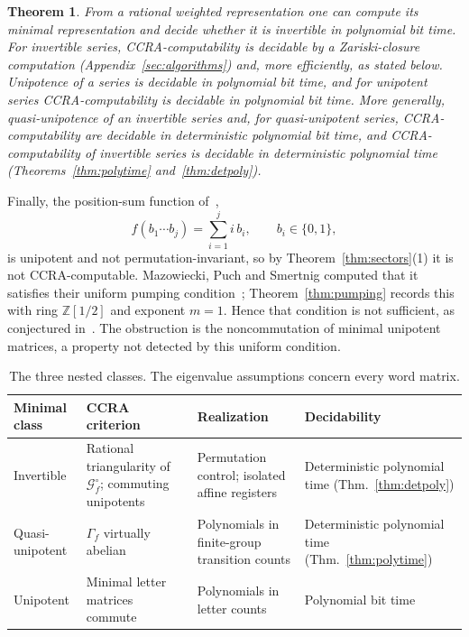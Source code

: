 \documentclass[11pt,letterpaper]{article}
\newcommand{\Z}{\mathbb{Z}}
\newcommand{\cG}{\mathcal{G}}
\newtheorem{theorem}{Theorem}
\theoremstyle{definition}
\begin{document}
\begin{theorem}\label{thm:decision}
From a rational weighted representation one can compute its minimal representation and decide whether it is invertible in polynomial bit time. For invertible series, CCRA-computability is decidable by a Zariski-closure computation (Appendix~\ref{sec:algorithms}) and, more efficiently, as stated below. Unipotence of a series is decidable in polynomial bit time, and for unipotent series CCRA-computability is decidable in polynomial bit time. More generally, quasi-unipotence of an invertible series and, for quasi-unipotent series, CCRA-computability are decidable in deterministic polynomial bit time, and CCRA-computability of invertible series is decidable in deterministic polynomial time (Theorems~\ref{thm:polytime} and~\ref{thm:detpoly}).
\end{theorem}

Finally, the position-sum function of~\cite[Example~26]{MPS26},
\begin{equation}\label{eq:witness}
 f(b_1\cdots b_j)=\sum_{i=1}^j i\,b_i,\qquad b_i\in\{0,1\},
\end{equation}
is unipotent and not permutation-invariant, so by Theorem~\ref{thm:sectors}(1) it is not CCRA-computable. Mazowiecki, Puch and Smertnig computed that it satisfies their uniform pumping condition~\cite[Example~26]{MPS26}; Theorem~\ref{thm:pumping} records this with ring $\Z[1/2]$ and exponent $m=1$. Hence that condition is not sufficient, as conjectured in~\cite[Section~3.2]{MPS26}. The obstruction is the noncommutation of minimal unipotent matrices, a property not detected by this uniform condition.

\begin{table}[t]
\centering
\begin{tabular}{@{}>{\raggedright\arraybackslash}p{.19\linewidth}>{\raggedright\arraybackslash}p{.29\linewidth}>{\raggedright\arraybackslash}p{.27\linewidth}>{\raggedright\arraybackslash}p{.15\linewidth}@{}}
\toprule
Minimal class & CCRA criterion & Realization & Decidability\\
\midrule
Invertible & Rational triangularity of $\cG_f^\circ$; commuting unipotents & Permutation control; isolated affine registers & Deterministic polynomial time (Thm.~\ref{thm:detpoly})\\
Quasi-unipotent & $\Gamma_f$ virtually abelian & Polynomials in finite-group transition counts & Deterministic polynomial time (Thm.~\ref{thm:polytime})\\
Unipotent & Minimal letter matrices commute & Polynomials in letter counts & Polynomial bit time\\
\bottomrule
\end{tabular}
\caption{The three nested classes. The eigenvalue assumptions concern every word matrix.}\label{tab:classes}
\end{table}
\end{document}
